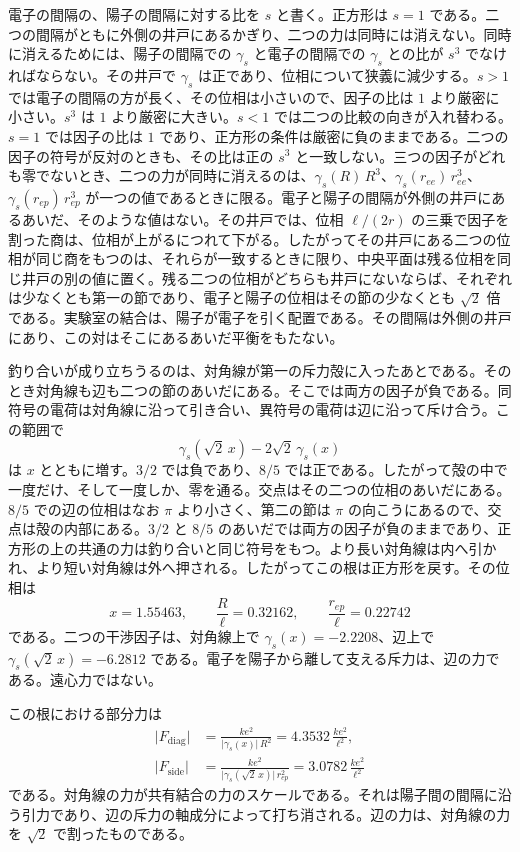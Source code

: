 \documentclass[a4paper]{article}
\begin{document}
電子の間隔の、陽子の間隔に対する比を \(s\) と書く。正方形は \(s=1\) である。二つの間隔がともに外側の井戸にあるかぎり、二つの力は同時には消えない。同時に消えるためには、陽子の間隔での \(\gamma_s\) と電子の間隔での \(\gamma_s\) との比が \(s^{3}\) でなければならない。その井戸で \(\gamma_s\) は正であり、位相について狭義に減少する。\(s>1\) では電子の間隔の方が長く、その位相は小さいので、因子の比は \(1\) より厳密に小さい。\(s^{3}\) は \(1\) より厳密に大きい。\(s<1\) では二つの比較の向きが入れ替わる。\(s=1\) では因子の比は \(1\) であり、正方形の条件は厳密に負のままである。二つの因子の符号が反対のときも、その比は正の \(s^{3}\) と一致しない。三つの因子がどれも零でないとき、二つの力が同時に消えるのは、\(\gamma_s(R)\,R^{3}\)、\(\gamma_s(r_{ee})\,r_{ee}^{3}\)、\(\gamma_s(r_{ep})\,r_{ep}^{3}\) が一つの値であるときに限る。電子と陽子の間隔が外側の井戸にあるあいだ、そのような値はない。その井戸では、位相 \(\ell/(2r)\) の三乗で因子を割った商は、位相が上がるにつれて下がる。したがってその井戸にある二つの位相が同じ商をもつのは、それらが一致するときに限り、中央平面は残る位相を同じ井戸の別の値に置く。残る二つの位相がどちらも井戸にないならば、それぞれは少なくとも第一の節であり、電子と陽子の位相はその節の少なくとも \(\sqrt{2}\) 倍である。実験室の結合は、陽子が電子を引く配置である。その間隔は外側の井戸にあり、この対はそこにあるあいだ平衡をもたない。

釣り合いが成り立ちうるのは、対角線が第一の斥力殻に入ったあとである。そのとき対角線も辺も二つの節のあいだにある。そこでは両方の因子が負である。同符号の電荷は対角線に沿って引き合い、異符号の電荷は辺に沿って斥け合う。この範囲で
\[
\gamma_s(\sqrt{2}\,x)-2\sqrt{2}\,\gamma_s(x)
\]
は \(x\) とともに増す。\(3/2\) では負であり、\(8/5\) では正である。したがって殻の中で一度だけ、そして一度しか、零を通る。交点はその二つの位相のあいだにある。\(8/5\) での辺の位相はなお \(\pi\) より小さく、第二の節は \(\pi\) の向こうにあるので、交点は殻の内部にある。\(3/2\) と \(8/5\) のあいだでは両方の因子が負のままであり、正方形の上の共通の力は釣り合いと同じ符号をもつ。より長い対角線は内へ引かれ、より短い対角線は外へ押される。したがってこの根は正方形を戻す。その位相は
\[
x=1.55463,
\qquad
\frac{R}{\ell}=0.32162,
\qquad
\frac{r_{ep}}{\ell}=0.22742
\]
である。二つの干渉因子は、対角線上で \(\gamma_s(x)=-2.2208\)、辺上で \(\gamma_s(\sqrt{2}\,x)=-6.2812\) である。電子を陽子から離して支える斥力は、辺の力である。遠心力ではない。

この根における部分力は
\begin{align}
\bigl|F_{\mathrm{diag}}\bigr|
  &=\frac{k e^{2}}{\bigl|\gamma_s(x)\bigr|\,R^{2}}
  =4.3532\,\frac{k e^{2}}{\ell^{2}},
\label{eq:Fdiag}\\
\bigl|F_{\mathrm{side}}\bigr|
  &=\frac{k e^{2}}{\bigl|\gamma_s(\sqrt{2}\,x)\bigr|\,r_{ep}^{2}}
  =3.0782\,\frac{k e^{2}}{\ell^{2}}
\label{eq:Fside}
\end{align}
である。対角線の力が共有結合の力のスケールである。それは陽子間の間隔に沿う引力であり、辺の斥力の軸成分によって打ち消される。辺の力は、対角線の力を \(\sqrt{2}\) で割ったものである。
\end{document}
